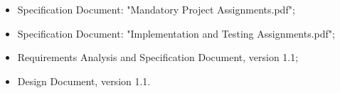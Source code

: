 \begin{itemize}
\item Specification Document: "Mandatory Project Assignments.pdf";
\item Specification Document: "Implementation and Testing Assignments.pdf";
\item Requirements Analysis and Specification Document, version 1.1;
\item Design Document, version 1.1.
\end{itemize}